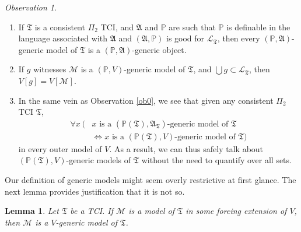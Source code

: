 \documentclass[12pt, twoside]{memoir}
\numberwithin{equation}{section}
\newtheorem{lem}[thm]{Lemma}
\theoremstyle{definition}
\theoremstyle{remark}
\newtheorem{ob}[thm]{Observation}
\theoremstyle{definition}
\theoremstyle{definition}
\theoremstyle{definition}
\theoremstyle{remark}
\begin{document}
\begin{ob}\label{smallvgen}
\leavevmode
\begin{enumerate}[label=(\arabic*)]
    \item\label{4401} If $\mathfrak{T}$ is a consistent $\Pi_2$ TCI, and $\mathfrak{A}$ and $\mathbb{P}$ are such that $\mathbb{P}$ is definable in the language associated with $\mathfrak{A}$ and $(\mathfrak{A}, \mathbb{P})$ is good for $\mathcal{L}_{\mathfrak{T}}$, then every $(\mathbb{P}, \mathfrak{A})$-generic model of $\mathfrak{T}$ is a $(\mathbb{P}, \mathfrak{A})$-generic object.
    \item\label{5282} If $g$ witnesses $\mathcal{M}$ is a $(\mathbb{P}, V)$-generic model of $\mathfrak{T}$, and $\bigcup g \subset \mathcal{L}_{\mathfrak{T}}$, then $V[g] = V[\mathcal{M}]$.
    \item\label{2svg} In the same vein as Observation \ref{ob0}, we see that given any consistent $\Pi_2$ TCI $\mathfrak{T}$, 
    \begin{align*}
        \forall x \ ( & x \text{ is a } (\mathbb{P}(\mathfrak{T}), \mathfrak{A}_{\mathfrak{T}}) \text{-generic model of } \mathfrak{T} \\
        & \iff x \text{ is a } (\mathbb{P}(\mathfrak{T}), V) \text{-generic model of } \mathfrak{T})
    \end{align*}
   in every outer model of $V$. As a result, we can thus safely talk about $(\mathbb{P}(\mathfrak{T}), V)$-generic models of $\mathfrak{T}$ without the need to quantify over all sets.
\end{enumerate}
\end{ob}

Our definition of generic models might seem overly restrictive at first glance. The next lemma provides justification that it is not so.

\begin{lem}\label{gmodelsinfe}
Let $\mathfrak{T}$ be a TCI. If $\mathcal{M}$ is a model of $\mathfrak{T}$ in some forcing extension of $V$, then $\mathcal{M}$ is a $V$-generic model of $\mathfrak{T}$.
\end{lem}
\end{document}
